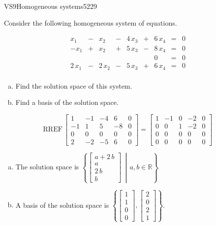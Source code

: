 \begin{exercise}{VS9}{Homogeneous systems}{5229} 
\begin{exerciseStatement} 

Consider the following homogeneous system of equations.

 \[\begin{matrix}
 x_{1} &  -  & x_{2} &  -  & 4 \, x_{3} &  +  & 6 \, x_{4} & = & 0 \\
 -x_{1} &  +  & x_{2} &  +  & 5 \, x_{3} &  -  & 8 \, x_{4} & = & 0 \\
 &  &  &  &  &  &  0  & = & 0 \\
 2 \, x_{1} &  -  & 2 \, x_{2} &  -  & 5 \, x_{3} &  +  & 6 \, x_{4} & = & 0 \\
 \end{matrix}\] 

\begin{enumerate}[(a)]
\item  Find the solution space of this system.
\item  Find a basis of the solution space.
\end{enumerate}

     \end{exerciseStatement}
 \begin{exerciseAnswer} 

\[\mathrm{RREF}\,\left[\begin{array}{cccc|c}
1 & -1 & -4 & 6 & 0 \\
-1 & 1 & 5 & -8 & 0 \\
0 & 0 & 0 & 0 & 0 \\
2 & -2 & -5 & 6 & 0
\end{array}\right]=\left[\begin{array}{cccc|c}
1 & -1 & 0 & -2 & 0 \\
0 & 0 & 1 & -2 & 0 \\
0 & 0 & 0 & 0 & 0 \\
0 & 0 & 0 & 0 & 0
\end{array}\right]\]

 

\begin{enumerate}[(a)]
\item The solution space is \( \left\{ \left[\begin{array}{c}
a + 2 \, b \\
a \\
2 \, b \\
b
\end{array}\right] \,\middle|\, a,b \in\mathbb R \right\} \) 
\item A basis of the solution space is \(\left\{ \left[\begin{array}{c}
1 \\
1 \\
0 \\
0
\end{array}\right] , \left[\begin{array}{c}
2 \\
0 \\
2 \\
1
\end{array}\right] \right\}\).
\end{enumerate}


\end{exerciseAnswer}
\end{exercise}
